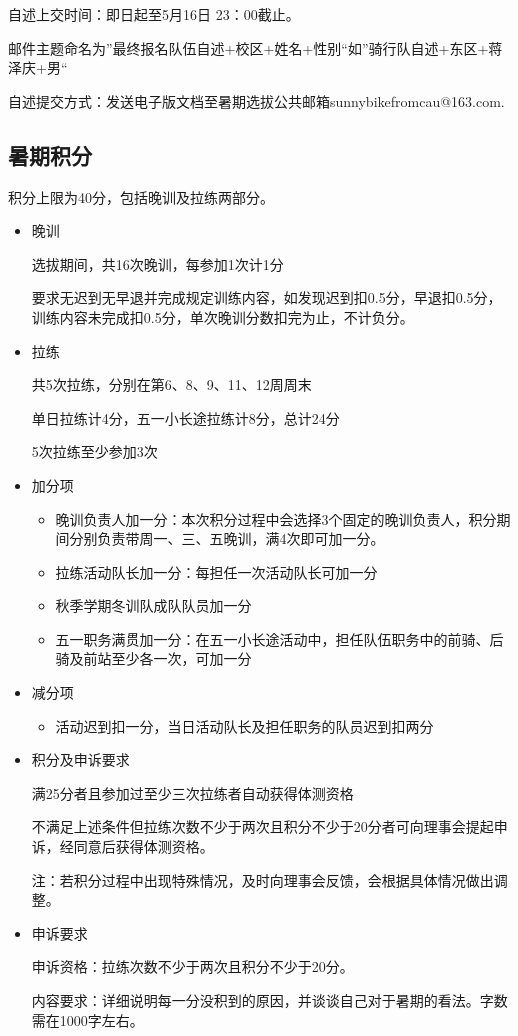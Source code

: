 \documentclass{ctexbook}
\begin{document}
自述上交时间：即日起至5月16日 23：00截止。

邮件主题命名为''最终报名队伍自述+校区+姓名+性别``如''骑行队自述+东区+蒋泽庆+男``

自述提交方式：发送电子版文档至暑期选拔公共邮箱sunnybikefromcau@163.com.

\subsection{暑期积分}

积分上限为40分，包括晚训及拉练两部分。

\begin{itemize}
    \item 晚训

 选拔期间，共16次晚训，每参加1次计1分

 要求无迟到无早退并完成规定训练内容，如发现迟到扣0.5分，早退扣0.5分，训练内容未完成扣0.5分，单次晚训分数扣完为止，不计负分。

\item 拉练

 共5次拉练，分别在第6、8、9、11、12周周末

 单日拉练计4分，五一小长途拉练计8分，总计24分

 5次拉练至少参加3次

\item 加分项
\begin{itemize}
    \item 晚训负责人加一分：本次积分过程中会选择3个固定的晚训负责人，积分期间分别负责带周一、三、五晚训，满4次即可加一分。
    \item  拉练活动队长加一分：每担任一次活动队长可加一分
    \item  秋季学期冬训队成队队员加一分
    \item  五一职务满贯加一分：在五一小长途活动中，担任队伍职务中的前骑、后骑及前站至少各一次，可加一分
\end{itemize}

\item 减分项
\begin{itemize}
    \item 活动迟到扣一分，当日活动队长及担任职务的队员迟到扣两分
\end{itemize} 

 

\item 积分及申诉要求

满25分者且参加过至少三次拉练者自动获得体测资格

不满足上述条件但拉练次数不少于两次且积分不少于20分者可向理事会提起申诉，经同意后获得体测资格。

注：若积分过程中出现特殊情况，及时向理事会反馈，会根据具体情况做出调整。

\item 申诉要求

申诉资格：拉练次数不少于两次且积分不少于20分。

内容要求：详细说明每一分没积到的原因，并谈谈自己对于暑期的看法。字数需在1000字左右。

\end{itemize}
\end{document}
